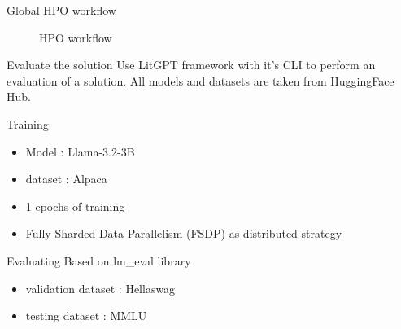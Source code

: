 \begin{frame}{Global HPO workflow}
            \begin{figure}
                \centering
                
                \caption{HPO workflow}
            \end{figure}
    
\end{frame}

\begin{frame}{Evaluate the solution}
    Use LitGPT framework with it's CLI to perform an evaluation of a solution. All models and datasets are taken from HuggingFace Hub.
    \begin{block}{Training}
        \begin{itemize}
            \item Model : Llama-3.2-3B
            \item dataset : Alpaca
            \item 1 epochs of training
            \item Fully Sharded Data Parallelism (FSDP) as distributed strategy
        \end{itemize}
    \end{block}

    \begin{block}{Evaluating}
        Based on lm\_eval library
        \begin{itemize}
            \item validation dataset : Hellaswag
            \item testing dataset : MMLU
        \end{itemize}
    \end{block}

    
\end{frame}


